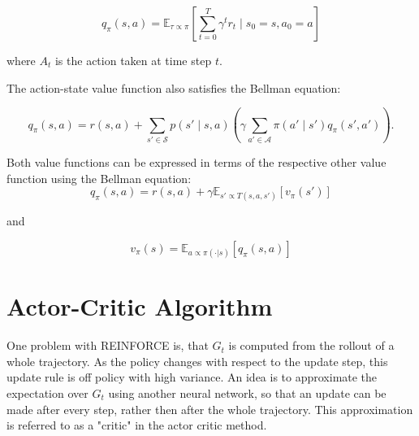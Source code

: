 \begin{equation}
    q_{\pi}(s, a) = \mathbb{E}_{\tau \propto \pi}\left[\sum_{t=0}^T \gamma^t r_t \mid s_0 = s, a_0=a\right]
\end{equation}

where $A_t$ is the action taken at time step $t$.

The action-state value function also satisfies the Bellman equation:

\begin{equation}
    \label{bmeq_q}
    q_{\pi}(s,a) = r(s,a) + \sum_{s' \in \mathcal{S}} p(s' \mid s,a) \left(\gamma \sum_{a' \in \mathcal{A}} \pi(a' \mid s') q_{\pi}(s',a')\right).
\end{equation}

Both value functions can be expressed in terms of the respective other value function using the Bellman equation:
\begin{equation}
    \label{q_from_v}
    q_{\pi}(s,a) = r(s,a) + \gamma \mathbb{E}_{s'\propto T(s,a,s')}\left[ v_{\pi}(s') \right]
\end{equation}

and 

\begin{equation}
    v_{\pi}(s) = \mathbb{E}_{a \propto \pi(\cdot|s)} \left[ q_\pi(s,a) \right]
\end{equation}



\section{Actor-Critic Algorithm}
One problem with REINFORCE is, that $G_t$ is computed from the rollout of a whole trajectory. As the policy changes with respect to the update step, this update 
rule is off policy with high variance. An idea is to approximate the expectation over $G_t$ using another neural network, so that an update can be made after every step, 
rather then after the whole trajectory. This approximation is referred to as a "critic" in the actor critic method.
